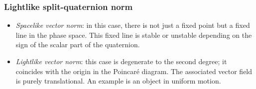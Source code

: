 \subsubsection*{Lightlike split-quaternion norm}
    \begin{itemize}
        \item[\circled{2}] \emph{Spacelike vector norm}: in this case, there is not just a fixed point but a fixed line in the phase space. This fixed line is stable or unstable depending on the sign of the scalar part of the quaternion. 
        \item[\circled{3}] \emph{Lightlike vector norm}: this case is degenerate to the second degree; it coincides with the origin in the Poincaré diagram. The associated vector field is purely translational. An example is an object in uniform motion.
    \end{itemize}
